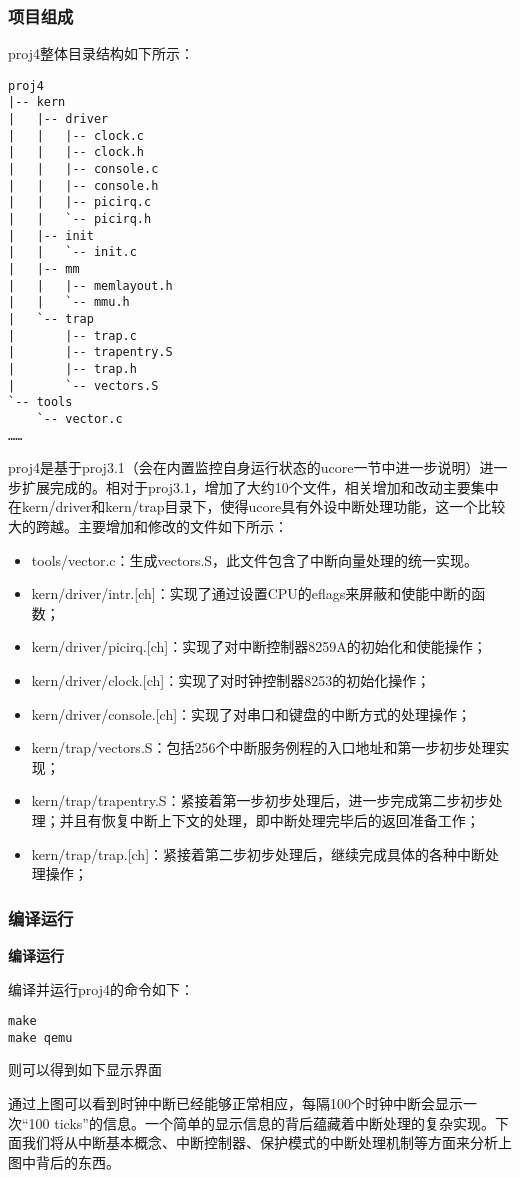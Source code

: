 \subsubsection{项目组成}\label{ux9879ux76eeux7ec4ux6210}

proj4整体目录结构如下所示：

\begin{lstlisting}
proj4
|-- kern
|   |-- driver
|   |   |-- clock.c
|   |   |-- clock.h
|   |   |-- console.c
|   |   |-- console.h
|   |   |-- picirq.c
|   |   `-- picirq.h
|   |-- init
|   |   `-- init.c
|   |-- mm
|   |   |-- memlayout.h
|   |   `-- mmu.h
|   `-- trap
|       |-- trap.c
|       |-- trapentry.S
|       |-- trap.h
|       `-- vectors.S
`-- tools
    `-- vector.c
…… 
\end{lstlisting}

proj4是基于proj3.1（会在内置监控自身运行状态的ucore一节中进一步说明）进一步扩展完成的。相对于proj3.1，增加了大约10个文件，相关增加和改动主要集中在kern/driver和kern/trap目录下，使得ucore具有外设中断处理功能，这一个比较大的跨越。主要增加和修改的文件如下所示：

\begin{itemize}
\item
  tools/vector.c：生成vectors.S，此文件包含了中断向量处理的统一实现。
\item
  kern/driver/intr.{[}ch{]}：实现了通过设置CPU的eflags来屏蔽和使能中断的函数；
\item
  kern/driver/picirq.{[}ch{]}：实现了对中断控制器8259A的初始化和使能操作；
\item
  kern/driver/clock.{[}ch{]}：实现了对时钟控制器8253的初始化操作；
\item
  kern/driver/console.{[}ch{]}：实现了对串口和键盘的中断方式的处理操作；
\item
  kern/trap/vectors.S：包括256个中断服务例程的入口地址和第一步初步处理实现；
\item
  kern/trap/trapentry.S：紧接着第一步初步处理后，进一步完成第二步初步处理；并且有恢复中断上下文的处理，即中断处理完毕后的返回准备工作；
\item
  kern/trap/trap.{[}ch{]}：紧接着第二步初步处理后，继续完成具体的各种中断处理操作；
\end{itemize}

\subsubsection{编译运行}\label{ux7f16ux8bd1ux8fd0ux884c}

\textbf{编译运行}

编译并运行proj4的命令如下：

\begin{lstlisting}
make
make qemu
\end{lstlisting}

则可以得到如下显示界面

通过上图可以看到时钟中断已经能够正常相应，每隔100个时钟中断会显示一次``100
ticks''的信息。一个简单的显示信息的背后蕴藏着中断处理的复杂实现。下面我们将从中断基本概念、中断控制器、保护模式的中断处理机制等方面来分析上图中背后的东西。
